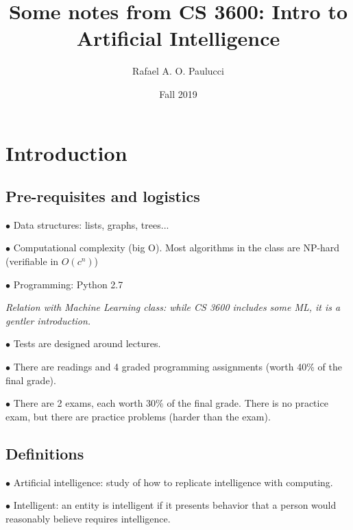 \documentclass[english,openany]{book}
\begin{document}
    \title{Some notes from CS 3600: Intro to Artificial Intelligence}
    \author{Rafael A. O. Paulucci}
    \date{Fall 2019}

    \maketitle

    \tableofcontents


    \chapter{Introduction}

    \section{Pre-requisites and logistics}

    $\bullet$ Data structures: lists, graphs, trees...

    $\bullet$ Computational complexity (big O). Most algorithms in the class are NP-hard (verifiable in $O(c^{n})$)

    $\bullet$ Programming: Python 2.7

    \textit{Relation with Machine Learning class: while CS 3600 includes some ML, it is a gentler introduction.}

    $\bullet$ Tests are designed around lectures.

    $\bullet$ There are readings and 4 graded programming assignments (worth 40\% of the final grade).

    $\bullet$ There are 2 exams, each worth 30\% of the final grade. There is no practice exam, but there are practice problems (harder than the exam).

    \section{Definitions}

    $\bullet$ Artificial intelligence: study of how to replicate intelligence with computing.

    $\bullet$ Intelligent: an entity is intelligent if it presents behavior that a person would reasonably believe requires intelligence.
\end{document}
